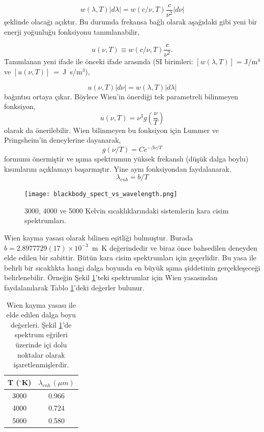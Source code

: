 \documentclass[a4paper,12pt, twoside]{article}
\begin{document}
\begin{equation}
\label{eq:uw_densities1}
w(\lambda,T)|d\lambda| = w(c/\nu,T)\frac{c}{\nu^2}|d\nu| 
\end{equation}
şeklinde olacağı açıktır. Bu durumda frekansa bağlı olarak aşağıdaki gibi yeni bir enerji yoğunluğu fonksiyonu tanımlanabilir,

\begin{equation}
\label{eq:uw_densities2}
u(\nu,T) \equiv w(c/\nu,T)\frac{c}{\nu^2}.
\end{equation}
Tanımlanan yeni ifade ile önceki ifade arasında (SI birimleri: $[w(\lambda,T)]$ = J/m$^4$ ve $[u(\nu,T)]$~=~J~s/m$^3$),

\begin{equation}
\label{eq:uw_densities3}
u(\nu,T)|d\nu| = w(\lambda,T)|d\lambda|
\end{equation}
bağıntısı ortaya çıkar. Böylece Wien'in önerdiği tek parametreli bilinmeyen fonksiyon,
\begin{equation}
\label{eq:ug_lambdaT}
u(\nu,T) = \nu^3 g(\frac{\nu}{T})
\end{equation}
olarak da önerilebilir. Wien bilinmeyen bu fonksiyon için Lummer ve Pringsheim'in deneylerine dayanarak,
\begin{equation}
\label{eq:g_lambdaT}
g(\nu/T) = C e^{-\beta \nu/T}
\end{equation}
formunu önermiştir ve ışıma spektrumun yüksek frekanslı (düşük dalga boylu) kısımlarını açıklamayı başarmıştır. Yine aynı fonksiyondan faydalanarak,
\begin{equation}
\label{eq:wien_shift}
\lambda_{enb} = b/T 
\end{equation}
\begin{figure}[hbtp]
\center
\texttt{[image: blackbody\_spect\_vs\_wavelength.png]}
\caption{3000, 4000 ve 5000 Kelvin sıcaklıklarındaki sistemlerin kara cisim spektrumları.}
\label{fig:karaSpektrum}
\end{figure}
Wien kayma yasası olarak bilinen eşitliği bulmuştur. Burada $b = 2.8977729(17)\times10^{-3}$~m~K değerindedir ve biraz önce bahsedilen deneyden elde edilen bir sabittir. Bütün kara cisim spektrumları için geçerlidir. Bu yasa ile belirli bir sıcaklıkta hangi dalga boyunda en büyük ışıma şiddetinin gerçekleşeceği belirlenebilir. Örneğin Şekil \ref{fig:karaSpektrum}'teki spektrumlar için Wien yasasından faydalanılarak Tablo \ref{tab:wien_shift}'deki değerler bulunur.
\begin{table}[hbtp]
\center
\begin{tabular}{|c|c|}
\hline
T ($^\circ$K) & $\lambda_{enb}\,(\mu m)$\\
\hline
3000 & 0.966 \\
4000 & 0.724 \\
5000 & 0.580 \\
\hline
\end{tabular}
\caption{\label{tab:wien_shift} Wien kayma yasası ile elde edilen dalga boyu değerleri. Şekil \ref{fig:karaSpektrum}'de spektrum eğrileri üzerinde içi dolu noktalar olarak işaretlenmişlerdir.}
\end{table}
\end{document}
